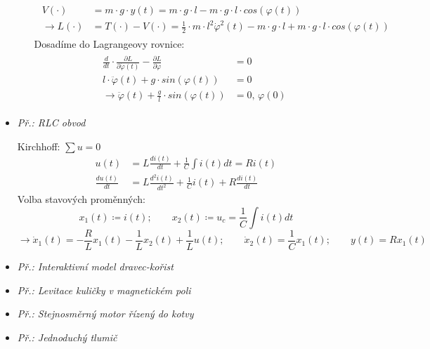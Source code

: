 \begin{itemize}
\begin{enumerate}[label=(\alph*)]
\begin{align*}
\begin{split}
\end{split}
\end{align*}
\begin{align*}
\begin{split}
V(\cdot) &= m \cdot g \cdot y(t) = m \cdot g \cdot l - m \cdot g \cdot l \cdot cos(\varphi(t)) \\
\to L(\cdot) &= T(\cdot) - V(\cdot) = \frac{1}{2} \cdot m \cdot l^2 \dot{\varphi}^2(t) - m \cdot g \cdot l + m \cdot g \cdot l \cdot cos(\varphi(t))
\end{split}
\end{align*}
Dosadíme do Lagrangeovy rovnice:
\begin{align*}
\begin{split}
\frac{d}{dt} \cdot \frac{\partial L}{\partial \dot{\varphi}(t)} - \frac{\partial L}{\partial \varphi} &= 0 \\
l \cdot \ddot{\varphi}(t) + g \cdot sin(\varphi(t)) &= 0 \\
\to \ddot{\varphi}(t) + \frac{g}{l} \cdot sin(\varphi(t)) &= 0, \, \varphi(0)
\end{split}
\end{align*}
\end{enumerate}
\item \textit{Př.: RLC obvod}

Kirchhoff: $ \boxed{\sum u = 0} $
\begin{align*}
u(t) &= L \frac{di(t)}{dt} + \frac{1}{C} \int i(t) dt = Ri(t) \\
\frac{du(t)}{dt} &= L \frac{d^2i(t)}{dt^2} + \frac{1}{C} i(t) + R \frac{di(t)}{dt}
\end{align*}
Volba stavových proměnných:
\begin{equation*}
x_1(t) \coloneqq i(t); \qquad x_2(t) \coloneqq u_c = \frac{1}{C} \int i(t) dt
\end{equation*}
\begin{equation*}
\to \dot{x}_1(t) = -\frac{R}{L} x_1(t) - \frac{1}{L} x_2(t) + \frac{1}{L} u(t); \qquad \dot{x}_2(t) = \frac{1}{C} x_1(t); \qquad y(t) = R x_1(t)
\end{equation*}
\item \textit{Př.: Interaktivní model dravec-kořist}
\vspace{2.5cm}
\item \textit{Př.: Levitace kuličky v magnetickém poli}
\vspace{2.5cm}
\item \textit{Př.: Stejnosměrný motor řízený do kotvy}
\vspace{3.5cm}
\item \textit{Př.: Jednoduchý tlumič}
\vspace{2.5cm}
\end{itemize}

